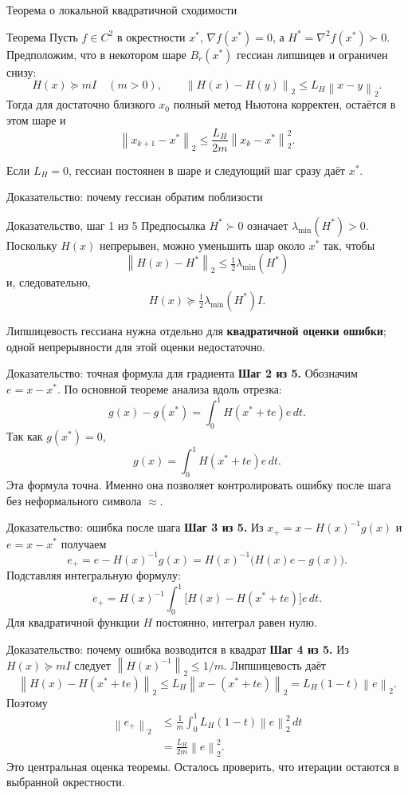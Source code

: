 \documentclass[aspectratio=169,10pt]{beamer}
\newcommand{\norm}[1]{\left\lVert #1\right\rVert}
\begin{document}
\begin{frame}{Теорема о локальной квадратичной сходимости}
\footnotesize
\begin{block}{Теорема}
Пусть $f\in C^2$ в окрестности $x^*$, $\nabla f(x^*)=0$, а $H^*=\nabla^2f(x^*)\succ0$.
Предположим, что в некотором шаре $B_r(x^*)$ гессиан липшицев и ограничен снизу:
\[
H(x)\succeq mI\quad(m>0),\qquad
\norm{H(x)-H(y)}_2\le L_H\norm{x-y}_2.
\]
Тогда для достаточно близкого $x_0$ полный метод Ньютона корректен, остаётся в этом шаре и
\[
\boxed{\norm{x_{k+1}-x^*}_2\le\frac{L_H}{2m}\norm{x_k-x^*}_2^2.}
\]
\end{block}
Если $L_H=0$, гессиан постоянен в шаре и следующий шаг сразу даёт $x^*$.
\end{frame}

\begin{frame}{Доказательство: почему гессиан обратим поблизости}
\small
\begin{block}{Доказательство, шаг 1 из 5}
Предпосылка $H^*\succ0$ означает $\lambda_{\min}(H^*)>0$.
Поскольку $H(x)$ непрерывен, можно уменьшить шар около $x^*$ так, чтобы
\[
\norm{H(x)-H^*}_2\le\tfrac12\lambda_{\min}(H^*)
\]
и, следовательно,
\[
H(x)\succeq \tfrac12\lambda_{\min}(H^*)I.
\]
\end{block}
Липшицевость гессиана нужна отдельно для \textbf{квадратичной оценки ошибки}; одной непрерывности для этой оценки недостаточно.
\end{frame}

\begin{frame}{Доказательство: точная формула для градиента}
\small
\textbf{Шаг 2 из 5.} Обозначим $e=x-x^*$. По основной теореме анализа вдоль отрезка:
\[
g(x)-g(x^*)=\int_0^1H(x^*+te)e\,dt.
\]
Так как $g(x^*)=0$,
\[
\boxed{g(x)=\int_0^1H(x^*+te)e\,dt.}
\]
Эта формула точна. Именно она позволяет контролировать ошибку после шага без неформального символа $\approx$.
\end{frame}

\begin{frame}{Доказательство: ошибка после шага}
\small
\textbf{Шаг 3 из 5.} Из $x_+=x-H(x)^{-1}g(x)$ и $e=x-x^*$ получаем
\[
e_+=e-H(x)^{-1}g(x)
=H(x)^{-1}\bigl(H(x)e-g(x)\bigr).
\]
Подставляя интегральную формулу:
\[
\boxed{e_+=H(x)^{-1}\int_0^1
\bigl[H(x)-H(x^*+te)\bigr]e\,dt.}
\]
Для квадратичной функции $H$ постоянно, интеграл равен нулю.
\end{frame}

\begin{frame}{Доказательство: почему ошибка возводится в квадрат}
\footnotesize
\textbf{Шаг 4 из 5.} Из $H(x)\succeq mI$ следует $\norm{H(x)^{-1}}_2\le 1/m$. Липшицевость даёт
\[
\norm{H(x)-H(x^*+te)}_2
\le L_H\norm{x-(x^*+te)}_2=L_H(1-t)\norm e_2.
\]
Поэтому
\[
\begin{aligned}
\norm{e_+}_2
&\le\frac1m\int_0^1 L_H(1-t)\norm e_2^2\,dt\\
&=\boxed{\frac{L_H}{2m}\norm e_2^2.}
\end{aligned}
\]
Это центральная оценка теоремы. Осталось проверить, что итерации остаются в выбранной окрестности.
\end{frame}
\end{document}
